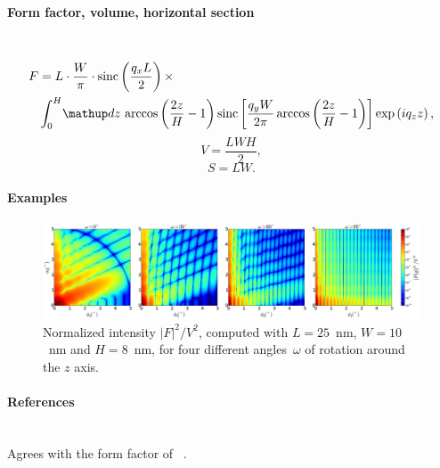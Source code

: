 \paragraph{Form factor, volume, horizontal section}\strut\\
\begin{align*}
F &=L \cdot \frac{W}{\pi}\cdot \sinc\left(\frac{q_xL}{2}\right)\times \\
&\int_0^H\!\d z\, \arccos\left(\frac{2z}{H}-1\right)\sinc\left[\frac{q_yW}{2\pi}\arccos\left(\frac{2z}{H} - 1\right)\right]\exp\left(iq_zz\right),
\end{align*}
\begin{equation*}
  V = \dfrac{L W H}{2},
\end{equation*}
\begin{equation*}
  S = L W.
\end{equation*}

\paragraph{Examples}\strut

\begin{figure}[H]
\begin{center}
\includegraphics[width=\textwidth]{fig/ff2/ff_Ripple1.pdf}
\end{center}
\caption{Normalized intensity $|F|^2/V^2$,
computed with $L=25$~nm, $W=10$~nm and $H=8$~nm,
for four different angles~$\omega$ of rotation around the $z$ axis.}
\end{figure}

\paragraph{References}\strut\\
Agrees with the  form factor of \FitGISAXS\ \cite{Bab13}.

 \label{SRipple2}

